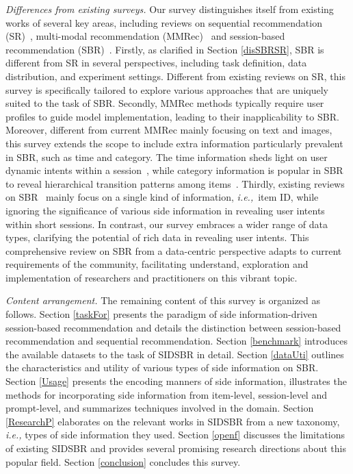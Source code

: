 \documentclass[lettersize,journal]{IEEEtran}
\newcommand{\ie}{\emph{i.e.,}\xspace}
\newcommand{\baby}{{SIDSBR}\xspace}
\begin{document}
\textit{Differences from existing surveys.}
Our survey distinguishes itself from existing works of several key areas, including reviews on sequential recommendation (SR)~\cite{Wang@IJCAI2019, Fang@TOIS2020}, multi-modal recommendation (MMRec)~\cite{Liu@ComSur2025, Sun@ECRA2019} and session-based recommendation (SBR)~\cite{ludewig@UMUAI2020,Wang@CS2022, Li@ComSur2025}. Firstly, as clarified in Section \ref{disSBRSR}, SBR is different from SR in several perspectives, including task definition, data distribution, and experiment settings. Different from existing reviews on SR, this survey is specifically tailored to explore various approaches that are uniquely suited to the task of SBR. Secondly, MMRec methods typically require user profiles to guide model implementation, leading to their inapplicability to SBR. Moreover, different from current MMRec mainly focusing on text and images, this survey extends the scope to include extra information particularly prevalent in SBR, such as time and category. The time information sheds light on user dynamic intents within a session~\cite{Alexander@arXiv2017,Yang@ICME2020}, while category information is popular in SBR to reveal hierarchical transition patterns among items~\cite{cai@SIGIR2021,lin@WWW2022}. Thirdly, existing reviews on SBR~\cite{ludewig@UMUAI2020,Wang@CS2022} mainly focus on a single kind of information, \ie~item ID, while ignoring the significance of various side information in revealing user intents within short sessions. In contrast, our survey embraces a wider range of data types, clarifying the potential of rich data in revealing user intents. This comprehensive review on SBR from a data-centric perspective adapts to current requirements of the community, facilitating understand, exploration and implementation of researchers and practitioners on this vibrant topic. 

\textit{Content arrangement.} 
The remaining content of this survey is organized as follows. Section \ref{taskFor} presents the paradigm of side information-driven session-based recommendation and details the distinction between session-based recommendation and sequential recommendation. Section \ref{benchmark} introduces the available datasets to the task of \baby in detail. Section \ref{dataUti} outlines the characteristics and utility of various types of side information on SBR. Section \ref{Usage} presents the encoding manners of side information, illustrates the methods for incorporating side information from item-level, session-level and prompt-level, and summarizes techniques involved in the domain. Section \ref{ResearchP} elaborates on the relevant works in \baby from a new  taxonomy, \ie types of side information they used. Section \ref{openf} discusses the limitations of existing \baby and provides several promising research directions about this popular field. Section \ref{conclusion} concludes this survey. 
\end{document}

